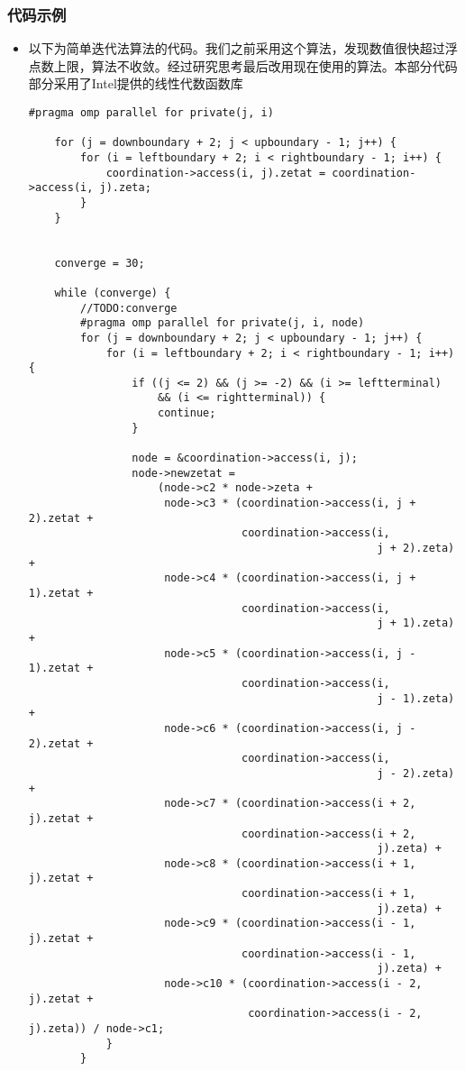 \documentclass[12pt]{article}
\begin{document}
\subsubsection{代码示例}
\begin{itemize}
\paragraph{简单迭代法}
\item 以下为简单迭代法算法的代码。我们之前采用这个算法，发现数值很快超过浮点数上限，算法不收敛。经过研究思考最后改用现在使用的算法。本部分代码部分采用了Intel提供的线性代数函数库\cite{intel}
\begin{lstlisting}
#pragma omp parallel for private(j, i)

    for (j = downboundary + 2; j < upboundary - 1; j++) {
        for (i = leftboundary + 2; i < rightboundary - 1; i++) {
            coordination->access(i, j).zetat = coordination->access(i, j).zeta;
        }
    }


    converge = 30;

    while (converge) {
        //TODO:converge
        #pragma omp parallel for private(j, i, node)
        for (j = downboundary + 2; j < upboundary - 1; j++) {
            for (i = leftboundary + 2; i < rightboundary - 1; i++) {
                if ((j <= 2) && (j >= -2) && (i >= leftterminal)
                    && (i <= rightterminal)) {
                    continue;
                }

                node = &coordination->access(i, j);
                node->newzetat =
                    (node->c2 * node->zeta +
                     node->c3 * (coordination->access(i, j + 2).zetat +
                                 coordination->access(i,
                                                      j + 2).zeta) +
                     node->c4 * (coordination->access(i, j + 1).zetat +
                                 coordination->access(i,
                                                      j + 1).zeta) +
                     node->c5 * (coordination->access(i, j - 1).zetat +
                                 coordination->access(i,
                                                      j - 1).zeta) +
                     node->c6 * (coordination->access(i, j - 2).zetat +
                                 coordination->access(i,
                                                      j - 2).zeta) +
                     node->c7 * (coordination->access(i + 2, j).zetat +
                                 coordination->access(i + 2,
                                                      j).zeta) +
                     node->c8 * (coordination->access(i + 1, j).zetat +
                                 coordination->access(i + 1,
                                                      j).zeta) +
                     node->c9 * (coordination->access(i - 1, j).zetat +
                                 coordination->access(i - 1,
                                                      j).zeta) +
                     node->c10 * (coordination->access(i - 2, j).zetat +
                                  coordination->access(i - 2, j).zeta)) / node->c1;
            }
        }


\end{lstlisting}
\end{itemize}
\end{document}
